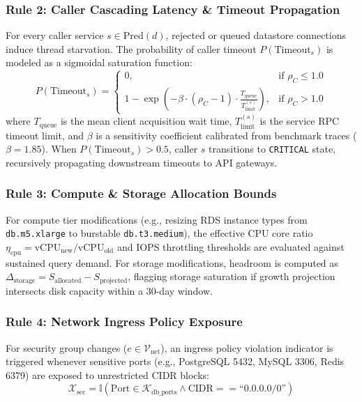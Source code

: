 \documentclass[conference]{IEEEtran}
\begin{document}
\subsubsection{Rule 2: Caller Cascading Latency \& Timeout Propagation}
For every caller service $s \in \text{Pred}(d)$, rejected or queued datastore connections induce thread starvation. The probability of caller timeout $P(\text{Timeout}_s)$ is modeled as a sigmoidal saturation function:
\begin{equation}
P(\text{Timeout}_s) = 
\begin{cases} 
0, & \text{if } \rho_C \le 1.0 \\
1 - \exp\left( -\beta \cdot (\rho_C - 1) \cdot \frac{T_{\text{queue}}}{T_{\text{limit}}^{(s)}} \right), & \text{if } \rho_C > 1.0
\end{cases}
\end{equation}
where $T_{\text{queue}}$ is the mean client acquisition wait time, $T_{\text{limit}}^{(s)}$ is the service RPC timeout limit, and $\beta$ is a sensitivity coefficient calibrated from benchmark traces ($\beta = 1.85$). When $P(\text{Timeout}_s) > 0.5$, caller $s$ transitions to \texttt{CRITICAL} state, recursively propagating downstream timeouts to API gateways.

\subsubsection{Rule 3: Compute \& Storage Allocation Bounds}
For compute tier modifications (e.g., resizing RDS instance types from \texttt{db.m5.xlarge} to burstable \texttt{db.t3.medium}), the effective CPU core ratio $\eta_{\text{cpu}} = \text{vCPU}_{\text{new}} / \text{vCPU}_{\text{old}}$ and IOPS throttling thresholds are evaluated against sustained query demand. For storage modifications, headroom is computed as $\Delta_{\text{storage}} = S_{\text{allocated}} - S_{\text{projected}}$, flagging storage saturation if growth projection intersects disk capacity within a 30-day window.

\subsubsection{Rule 4: Network Ingress Policy Exposure}
For security group changes ($e \in \mathcal{V}_{\text{net}}$), an ingress policy violation indicator is triggered whenever sensitive ports (e.g., PostgreSQL 5432, MySQL 3306, Redis 6379) are exposed to unrestricted CIDR blocks:
\begin{equation}
\mathcal{X}_{\text{sec}} = \mathbb{I}\left( \text{Port} \in \mathcal{K}_{\text{db\_ports}} \land \text{CIDR} == \text{``0.0.0.0/0''} \right)
\end{equation}
\end{document}

